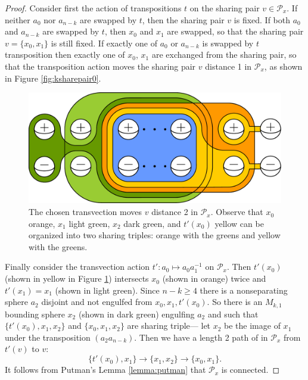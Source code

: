 \begin{proof}
  Consider first the action of   transpositions $t$ on
  the sharing pair $v \in \mathcal P_x$.
  If neither $a_0$ nor $a_{n-k}$ are swapped by $t$,
  then the sharing pair $v$ is fixed.
  If both $a_0$ and $a_{n-k}$ are swapped by $t$,
  then $x_0$ and $x_1$ are swapped, so that the sharing pair $v=\{x_0,x_1\}$
  is still fixed.
  If exactly one of $a_0$ or $a_{n-k}$ is swapped by $t$
  transposition then exactly one of $x_0$, $x_1$ are exchanged from the sharing pair,
  so that the transposition action moves the sharing pair $v$ distance 1 in $\mathcal P_x$,
  as shown in Figure \ref{fig:ksharepair0}.


  \begin{figure}[t!]
    \centering
          \includegraphics[width=.6\textwidth]{figures/ksharepairgraph1.pdf}
          \caption{The chosen transvection moves $v$
          distance 2 in $\mathcal P_x$.
          Observe that $x_0$ orange, $x_1$ light green,
          $x_2$ dark green, and $t'(x_0)$ yellow can be organized
          into two sharing triples: orange with the greens and yellow with the greens.}
          \label{fig:ksharepair1}
  \end{figure}

  Finally consider the transvection action $t':a_0 \mapsto a_0a_1^{-1}$ on $\mathcal P_x$.
Then $t'(x_0)$ (shown in yellow in Figure \ref{fig:ksharepair1})
intersects $x_0$ (shown in orange) twice and $t'(x_1)=x_1$ (shown in light green).
Since $n-k\geq 4$ there is a nonseparating sphere $a_2$
disjoint and not engulfed from $x_0, x_1, t'(x_0)$.
So there is an $M_{k,1}$ bounding sphere $x_2$ (shown in dark green)
engulfing $a_2$ and such that $\{t'(x_0),x_1,x_2\}$ and $\{x_0,x_1,x_2\}$ are sharing triple---
let $x_2$ be the image of $x_1$ under the transposition $(a_2a_{n-k})$.
Then we have a length 2 path of in $\mathcal P_x$
from $t'(v)$ to $v$:
$$\{t'(x_0),x_1 \} \to \{x_1,x_2\} \to \{x_0,x_1\}.$$
It follows from Putman's Lemma \ref{lemma:putman} that $\mathcal P_x$
is connected.
\end{proof}

